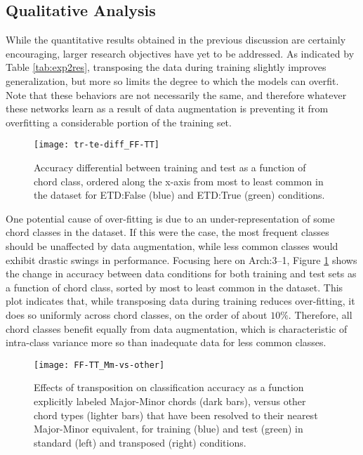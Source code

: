 \subsection{Qualitative Analysis}
\label{subsec:Qualitative_analysis}

While the quantitative results obtained in the previous discussion are certainly encouraging, larger research objectives have yet to be addressed.
As indicated by Table \ref{tab:exp2res}, transposing the data during training slightly improves generalization, but more so limits the degree to which the models can overfit.
Note that these behaviors are not necessarily the same, and therefore whatever these networks learn as a result of data augmentation is preventing it from overfitting a considerable portion of the training set.


\begin{figure}[!t]
\centering
 \centerline{\texttt{[image: tr-te-diff\_FF-TT]}}
\caption{Accuracy differential between training and test as a function of chord class, ordered along the x-axis from most to least common in the dataset for ETD:False (blue) and ETD:True (green) conditions.}
\label{fig:classes}
\end{figure}

One potential cause of over-fitting is due to an under-representation of some chord classes in the dataset.
If this were the case, the most frequent classes should be unaffected by data augmentation, while less common classes would exhibit drastic swings in performance.
Focusing here on Arch:3--1, Figure \ref{fig:classes} shows the change in accuracy between data conditions for both training and test sets as a function of chord class, sorted by most to least common in the dataset.
This plot indicates that, while transposing data during training reduces over-fitting, it does so uniformly across chord classes, on the order of about $10\%$.
Therefore, all chord classes benefit equally from data augmentation, which is characteristic of intra-class variance more so than inadequate data for less common classes.

\begin{figure}[!t]
\centering
\texttt{[image: FF-TT\_Mm-vs-other]}
\caption{Effects of transposition on classification accuracy as a function explicitly labeled Major-Minor chords (dark bars), versus other chord types (lighter bars) that have been resolved to their nearest Major-Minor equivalent, for training (blue) and test (green) in standard (left) and transposed (right) conditions.}
\label{fig:strict_vs_others}
\end{figure}

